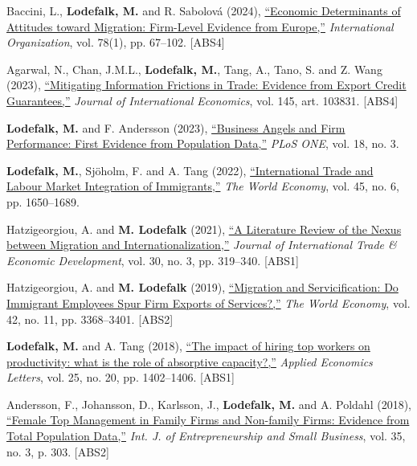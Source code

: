 \documentclass[11pt,a4paper]{article}
\newcommand{\name}[1]{\textbf{#1}}
\newcommand{\publication}[1]{\item #1}
\newcommand{\absrank}[1]{\textcolor{rankgray}{\scriptsize [ABS#1]}}
\begin{document}
\begin{enumerate}[label={[\arabic*]}]
\publication{Baccini, L., \name{Lodefalk, M.} and R. Sabolová (2024), \href{https://doi.org/10.1017/s0020818323000255}{``Economic Determinants of Attitudes toward Migration: Firm-Level Evidence from Europe,''} \textit{International Organization}, vol. 78(1), pp. 67--102. \absrank{4}}

\publication{Agarwal, N., Chan, J.M.L., \name{Lodefalk, M.}, Tang, A., Tano, S. and Z. Wang (2023), \href{https://doi.org/10.1016/j.jinteco.2023.103831}{``Mitigating Information Frictions in Trade: Evidence from Export Credit Guarantees,''} \textit{Journal of International Economics}, vol. 145, art. 103831. \absrank{4}}

\publication{\name{Lodefalk, M.} and F. Andersson (2023), \href{https://doi.org/10.1371/journal.pone.0283690}{``Business Angels and Firm Performance: First Evidence from Population Data,''} \textit{PLoS ONE}, vol. 18, no. 3.}

\publication{\name{Lodefalk, M.}, Sjöholm, F. and A. Tang (2022), \href{https://doi.org/10.1111/twec.13240}{``International Trade and Labour Market Integration of Immigrants,''} \textit{The World Economy}, vol. 45, no. 6, pp. 1650--1689.}

\publication{Hatzigeorgiou, A. and \name{M. Lodefalk} (2021), \href{https://doi.org/10.1080/09638199.2021.1878257}{``A Literature Review of the Nexus between Migration and Internationalization,''} \textit{Journal of International Trade \& Economic Development}, vol. 30, no. 3, pp. 319--340. \absrank{1}}

\publication{Hatzigeorgiou, A. and \name{M. Lodefalk} (2019), \href{https://doi.org/10.1111/twec.12838}{``Migration and Servicification: Do Immigrant Employees Spur Firm Exports of Services?,''} \textit{The World Economy}, vol. 42, no. 11, pp. 3368--3401. \absrank{2}}

\publication{\name{Lodefalk, M.} and A. Tang (2018), \href{https://doi.org/10.1080/13504851.2017.1422594}{``The impact of hiring top workers on productivity: what is the role of absorptive capacity?,''} \textit{Applied Economics Letters}, vol. 25, no. 20, pp. 1402--1406. \absrank{1}}

\publication{Andersson, F., Johansson, D., Karlsson, J., \name{Lodefalk, M.} and A. Poldahl (2018), \href{https://doi.org/10.1504/ijesb.2018.095903}{``Female Top Management in Family Firms and Non-family Firms: Evidence from Total Population Data,''} \textit{Int. J. of Entrepreneurship and Small Business}, vol. 35, no. 3, p. 303. \absrank{2}}


\end{enumerate}
\end{document}

